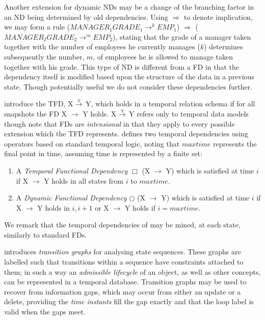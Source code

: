 \medskip

Another extension for dynamic NDs may be a change of the branching
factor in an ND being determined by old dependencies. Using
$\Rightarrow$ to denote implication, we may form a rule
($MANAGER_1 GRADE_1 \to^k EMP_1$) $\Rightarrow$  ($MANAGER_2 GRADE_2 \to^m EMP_2$),
stating that the grade of a manager taken together with the number of employees
he currently manages ($k$) determines subsequently the number, $m$, of 
employees he is allowed to manage taken together with his grade. 
This type of ND is 
different from a FD in that the dependency itself is
modified based upon the structure of the data in a previous
state. Though potentially useful we
do not consider these dependencies further.

\smallskip
{}    
\cite{jss96} introduce the TFD, X $\stackrel{\mbox{\tiny{T}}}{\to}$ Y, which
holds in a temporal relation schema if for all snapshots the FD X $\to$ Y
holds. X $\stackrel{\mbox{\tiny{T}}}{\to}$ Y refers only to
temporal data models though \cite{jss96} note that FDs are {\em
intensional} in that they apply to every possible extension which the
TFD represents.
\cite{wij95} defines two temporal dependencies using operators based
 on standard temporal logic, noting that $maxtime$ represents the
 final point in time, assuming time is represented by a finite set:
\begin{enumerate}
\item A {\em Temporal Functional Dependency} $\Box$ (X $\to$ Y) which
 is satisfied at time $i$ if X $\to$ Y holds in all states from $i$ to
 $maxtime$.
\item A {\em Dynamic Functional Dependency} $\bigcirc$ (X $\to$ Y)
which is satisfied at time $i$ if X $\to$ Y holds in $i, i + 1$ or X
$\to$ Y holds if $i = maxtime$. 
\end{enumerate}

We remark that the
temporal dependencies of \cite{Via87,wij95} may be mined, at each
state, similarly to standard FDs.

\cite{gl95} introduces {\em transition graphs} for analysing state
sequences. These graphs are labelled
such that transitions within a sequence have constraints attached to
them; in such a way an {\em admissible lifecycle} of an object, as well
as other concepts, can be represented in a temporal database.
Transition graphs may be used to 
recover from information gaps, which may occur from either an update or
a delete, providing the {\em time instants} fill the gap exactly and that
the loop label is valid when the gaps meet. 


